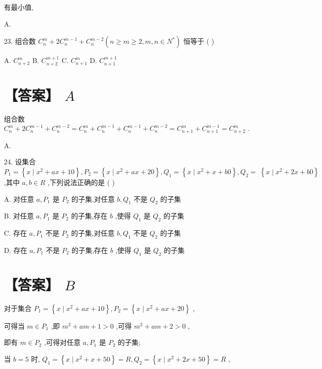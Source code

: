 \documentclass[10pt]{article}
\begin{document}
有最小值,

A.

23. 组合数 \({C}_{n}^{m} + 2{C}_{n}^{m - 1} + {C}_{n}^{m - 2}\left( {n \geq  m \geq  2,m,n \in  {N}^{ * }}\right)\) 恒等于 ( )

A. \({C}_{n + 2}^{m}\) B. \({C}_{n + 2}^{m + 1}\) C. \({C}_{n + 1}^{m}\) D. \({C}_{n + 1}^{m + 1}\)

\section*{【答案】 \(A\)}

组合数 \({C}_{n}^{m} + 2{C}_{n}^{m - 1} + {C}_{n}^{m - 2} = {C}_{n}^{m} + {C}_{n}^{m - 1} + {C}_{n}^{m - 1} + {C}_{n}^{m - 2} = {C}_{n + 1}^{m} + {C}_{n + 1}^{m - 1} = {C}_{n + 2}^{m}\) .

A.

24. 设集合 \({P}_{1} = \left\{  {x \mid  {x}^{2} + {ax} + {10}}\right\}  ,{P}_{2} = \left\{  {x \mid  {x}^{2} + {ax} + {20}}\right\}  ,{Q}_{1} = \left\{  {x \mid  {x}^{2} + x + {b0}}\right\}  ,{Q}_{2} = \; \left\{  {x \mid  {x}^{2} + {2x} + {b0}}\right\}\) ,其中 \(a,b \in  R\) ,下列说法正确的是 ( )

A. 对任意 \(a,{P}_{1}\) 是 \({P}_{2}\) 的子集,对任意 \(b,{Q}_{1}\) 不是 \({Q}_{2}\) 的子集

B. 对任意 \(a,{P}_{1}\) 是 \({P}_{2}\) 的子集,存在 \(b\) ,使得 \({Q}_{1}\) 是 \({Q}_{2}\) 的子集

C. 存在 \(a,{P}_{1}\) 不是 \({P}_{2}\) 的子集,对任意 \(b,{Q}_{1}\) 不是 \({Q}_{2}\) 的子集

D. 存在 \(a,{P}_{1}\) 不是 \({P}_{2}\) 的子集,存在 \(b\) ,使得 \({Q}_{1}\) 是 \({Q}_{2}\) 的子集

\section*{【答案】 \(B\)}

对于集合 \({P}_{1} = \left\{  {x \mid  {x}^{2} + {ax} + {10}}\right\}  ,{P}_{2} = \left\{  {x \mid  {x}^{2} + {ax} + {20}}\right\}\) ,

可得当 \(m \in  {P}_{1}\) ,即 \({m}^{2} + {am} + 1 > 0\) ,可得 \({m}^{2} + {am} + 2 > 0\) ,

即有 \(m \in  {P}_{2}\) ,可得对任意 \(a,{P}_{1}\) 是 \({P}_{2}\) 的子集;

当 \(b = 5\) 时, \({Q}_{1} = \left\{  {x \mid  {x}^{2} + x + {50}}\right\}   = R,{Q}_{2} = \left\{  {x \mid  {x}^{2} + {2x} + {50}}\right\}   = R\) ,
\end{document}
